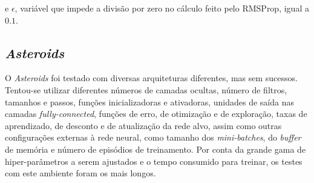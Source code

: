 e $\epsilon$, variável que impede a divisão por zero no cálculo feito pelo RMSProp, igual a $0.1$.


\subsection{\textit{Asteroids}}
\label{sec:arq_asteroids}

O \textit{Asteroids} foi testado com diversas arquiteturas diferentes, mas sem sucessos.
Tentou-se utilizar diferentes números de camadas ocultas, número de filtros, tamanhos e passos, funções inicializadoras e ativadoras, unidades de saída nas camadas \textit{fully-connected}, funções de erro, de otimização e de exploração, taxas de aprendizado, de desconto e de atualização da rede alvo, assim como outras configurações externas à rede neural, como tamanho dos \textit{mini-batches}, do \textit{buffer} de memória e número de episódios de treinamento.
Por conta da grande gama de hiper-parâmetros a serem ajustados e o tempo consumido para treinar, os testes com este ambiente foram os mais longos.

